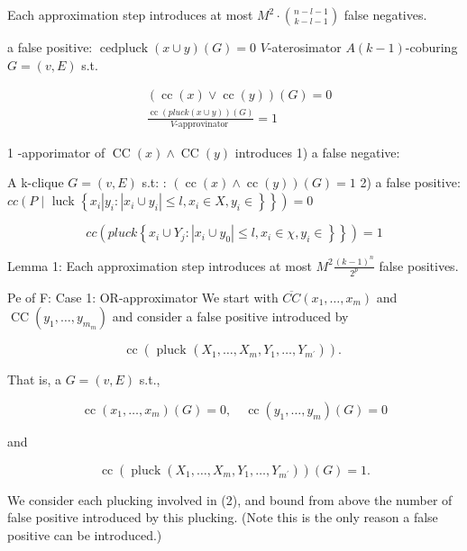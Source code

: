 \begin{lemma}\label{lem:new-false-negatives}
Each approximation step introduces at most $M^2 \cdot\binom{n-l-1}{k-l-1}$ false negatives.
\end{lemma}


\bigskip



 a false positive:
$\operatorname{cedpluck}(x \cup y)(G)=0$
$V$-aterosimator
$A(k-1)$-coburing $G=(v, E)$ s.t.

$$
\begin{aligned}
& (\operatorname{cc}(x) \vee \operatorname{cc}(y))(G)=0 \\
& \frac{\operatorname{cc}(p l u c k(x \cup y))(G)}{V \text {-approvinator }}=1
\end{aligned}
$$


1 -apporimator of $\operatorname{CC}(x) \wedge \operatorname{CC}(y)$ introduces
1) a false negative:

A k-clique $G=(v, E)$ s.t: : $(\operatorname{cc}(x) \wedge \operatorname{cc}(y))(G)=1$
2) a false positive: $c c\left(P \mid\right.$ luck $\left.\left\{x_i\left|y_i:\left|x_i \cup y_i\right| \leq l, x_i \in X, y_i \in\right\}\right\}\right)=0$

$$
\left.c c\left(p l u c k\left\{x_i \cup Y_j:\left|x_i \cup y_0\right| \leq l, x_i \in \chi, y_i \in\right\}\right\}\right)=1
$$




Lemma 1: Each approximation step introduces at most $M^2 \frac{(k-1)^n}{2^p}$ false positives.

Pe of F: Case 1: OR-approximator
We start with $\overline{C C}\left(x_1, \ldots, x_m\right)$ and $\operatorname{CC}\left(y_1, \ldots, y_{m_m}\right)$ and consider a false positive introduced by

$$
\operatorname{cc}\left(\text { pluck }\left(X_1, \ldots, X_m, Y_1, \ldots, Y_{m^{\prime}}\right)\right) \text {. }
$$


That is, a $G=(v, E)$ s.t.,

$$
\operatorname{cc}\left(x_1, \ldots, x_m\right)(G)=0, \quad \operatorname{cc}\left(y_1, \ldots, y_m\right)(G)=0
$$

and

$$
\operatorname{cc}\left(\operatorname{pluck}\left(X_1, \ldots, X_m, Y_1, \ldots, Y_{m^{\prime}}\right)\right)(G)=1 .
$$


We consider each plucking involved in (2), and bound from above the number of false positive introduced by this plucking. (Note this is the only reason a false positive can be introduced.)


